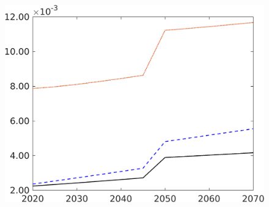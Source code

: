 \begin{figure}[h!!]
\begin{minipage}[]{0.32\textwidth}
	\end{minipage}
	\begin{minipage}[]{0.32\textwidth}
		\includegraphics[width=1\textwidth]{../../codding_model/own_basedOnFried/optimalPol_190722_tidiedUp/figures/all_10Aout22/CompMod1_OPT_T_NoTaus_Lg_regime3_spillover0_noskill0_sep1_xgrowth0_extern0_PV1_etaa0.79_lgd0.png}
	\end{minipage}
\end{figure}




